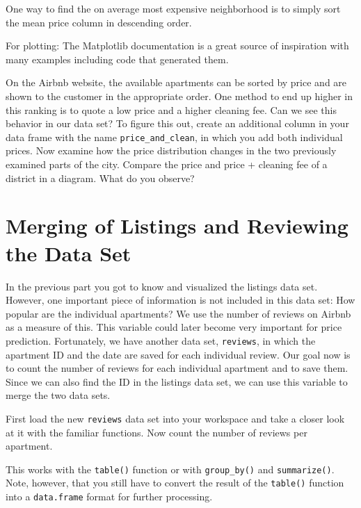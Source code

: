 \documentclass[
  11pt,
]{book}
\newenvironment{tips}[1]
  {
  \begin{itemize}
  \footnotesize
  \renewcommand{\labelitemi}{
    \raisebox{-.7\height}[0pt][0pt]{
      {\setkeys{Gin}{width=3em,keepaspectratio}
        \texttt{[image: images/\#1.png]}}
    }
  }
  \setlength{\fboxsep}{1em}
  \begin{rbox}
  \item
  }
  {
  \end{rbox}
  \end{itemize}
  }
\newenvironment{tipsp}[1]
  {
  \begin{itemize}
  \footnotesize
  \renewcommand{\labelitemi}{
    \raisebox{-.7\height}[0pt][0pt]{
      {\setkeys{Gin}{width=3em,keepaspectratio}
        \texttt{[image: images/\#1.png]}}
    }
  }
  \setlength{\fboxsep}{1em}
  \begin{pbox}
  \item
  }
  {
  \end{pbox}
  \end{itemize}
  }
\begin{document}
\begin{tipsp}p

One way to find the on average most expensive neighborhood is to simply sort the mean price column in descending order.

For plotting: The Matplotlib documentation is a great source of inspiration with many examples including code that generated them.

\end{tipsp}

On the Airbnb website, the available apartments can be sorted by price and are shown to the customer in the appropriate order. One method to end up higher in this ranking is to quote a low price and a higher cleaning fee. Can we see this behavior in our data set? To figure this out, create an additional column in your data frame with the name \texttt{price\_and\_clean}, in which you add both individual prices. Now examine how the price distribution changes in the two previously examined parts of the city. Compare the price and price + cleaning fee of a district in a diagram. What do you observe?

\hypertarget{merging-of-listings-and-reviewing-the-data-set}{%
\section{Merging of Listings and Reviewing the Data Set}\label{merging-of-listings-and-reviewing-the-data-set}}

In the previous part you got to know and visualized the listings data set. However, one important piece of information is not included in this data set: How popular are the individual apartments? We use the number of reviews on Airbnb as a measure of this. This variable could later become very important for price prediction. Fortunately, we have another data set, \texttt{reviews}, in which the apartment ID and the date are saved for each individual review. Our goal now is to count the number of reviews for each individual apartment and to save them. Since we can also find the ID in the listings data set, we can use this variable to merge the two data sets.

First load the new \texttt{reviews} data set into your workspace and take a closer look at it with the familiar functions. Now count the number of reviews per apartment.

\begin{tips}r

This works with the \texttt{table()} function or with \texttt{group\_by()} and \texttt{summarize()}. Note, however, that you still have to convert the result of the \texttt{table()} function into a \texttt{data.frame} format for further processing.

\end{tips}
\end{document}
